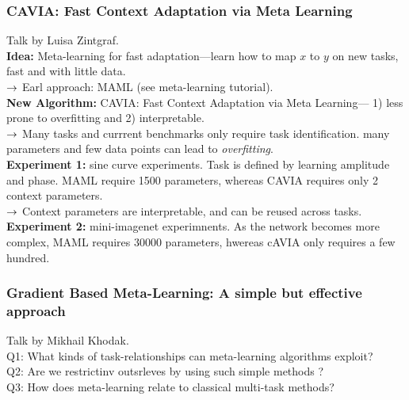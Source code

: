 \spacerule
\subsubsection{CAVIA: Fast Context Adaptation via Meta Learning}

Talk by Luisa Zintgraf. \\

{\bf Idea:} Meta-learning for fast adaptation---learn how to map $x$ to $y$ on new tasks, fast and with little data. \\

$\rightarrow$ Earl approach: MAML (see meta-learning tutorial). \\

{\bf New Algorithm:} CAVIA: Fast Context Adaptation via Meta Learning--- 1) less prone to overfitting and 2) interpretable. \\

$\rightarrow$ Many tasks and currrent benchmarks only require task identification. many parameters and few data points can lead to {\it overfitting}. \\

{\bf Experiment 1:} sine curve experiments. Task is defined by learning amplitude and phase. MAML require 1500 parameters, whereas CAVIA requires only 2 context parameters. \\

$\rightarrow$ Context parameters are interpretable, and can be reused across tasks. \\

{\bf Experiment 2:} mini-imagenet experimnents. As the network becomes more complex, MAML requires 30000 parameters, hwereas cAVIA only requires a few hundred. \\

\spacerule

\subsubsection{Gradient Based Meta-Learning: A simple but effective approach}

Talk by Mikhail Khodak. \\

Q1: What kinds of task-relationships can meta-learning algorithms exploit?  \\

Q2: Are we restrictinv outsrleves by using such simple methods ? \\

Q3: How does meta-learning relate to classical multi-task methods? \\


